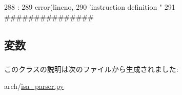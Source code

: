 \begin{DoxyCode}
288                                                     :
289         error(lineno,
290               'instruction definition "%
291 
###############
\end{DoxyCode}


\subsection{変数}
\hypertarget{classisa__parser_1_1NoFormat_a67bc6d696e25f3a04d5f4c0f9d9aa0f8}{
\subsubsection[{defaultInst}]{}}
\label{classisa__parser_1_1NoFormat_a67bc6d696e25f3a04d5f4c0f9d9aa0f8}


このクラスの説明は次のファイルから生成されました:\begin{DoxyCompactItemize}
\item 
arch/\hyperlink{isa__parser_8py}{isa\_\-parser.py}\end{DoxyCompactItemize}
